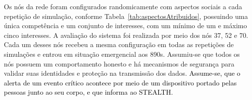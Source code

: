\documentclass[12pt]{article}
\newcommand{\rev}[1]{\textcolor{black}{{#1}}}
\begin{document}
Os nós da rede foram configurados randomicamente com aspectos sociais a cada repetição de simulação, conforme Tabela~\ref{tab:aspectosAtribuidos}, possuindo uma única competência e um conjunto de interesses, com um mínimo de um e máximo cinco interesses.
A avaliação
do sistema foi realizada
por meio
dos nós
37, 52 e 70. Cada um desses nós recebeu a mesma configuração em todas as repetições de simulações e entrou em situação emergencial aos 890s. Assumiu-se que todos os nós %
possuem 
um comportamento honesto e há mecanismos de segurança para validar suas identidades e proteção na transmissão dos dados. \rev{Assume-se, 
que o alerta de um evento crítico acontece por meio de um dispositivo portado pelas pessoas junto ao seu corpo, e que informa ao \mbox{STEALTH}.}

\end{document}
